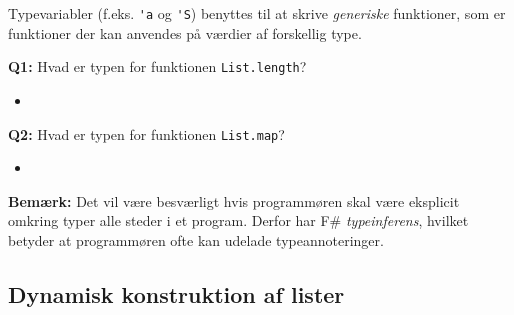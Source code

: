 \documentclass[rgb]{beamer}
\begin{document}
\begin{frame}[fragile]
\begin{footnotesize}

  \vspace{2mm}

  Typevariabler (f.eks. \lstinline{'a} og \lstinline{'S}) benyttes til at skrive
  \emph{generiske} funktioner, som er funktioner der kan anvendes på
  værdier af forskellig type.

  \vspace{4mm}
  \textbf{Q1:} Hvad er typen for funktionen \lstinline{List.length}?
  \vspace{1mm}

  \begin{itemize}
  \item \underline{\hspace{10cm}}
  \end{itemize}

  \vspace{4mm}
  \textbf{Q2:} Hvad er typen for funktionen \lstinline{List.map}?
  \vspace{1mm}

  \begin{itemize}
  \item \underline{\hspace{10cm}}
  \end{itemize}

  \vspace{4mm} \textbf{Bemærk:} Det vil være besværligt hvis
  programmøren skal være eksplicit omkring typer alle steder i et
  program. Derfor har F\#
  \emph{typeinferens}, hvilket betyder at programmøren ofte kan
  udelade typeannoteringer.
\end{footnotesize}
\end{frame}


\subsection{Dynamisk konstruktion af lister}
\end{document}
